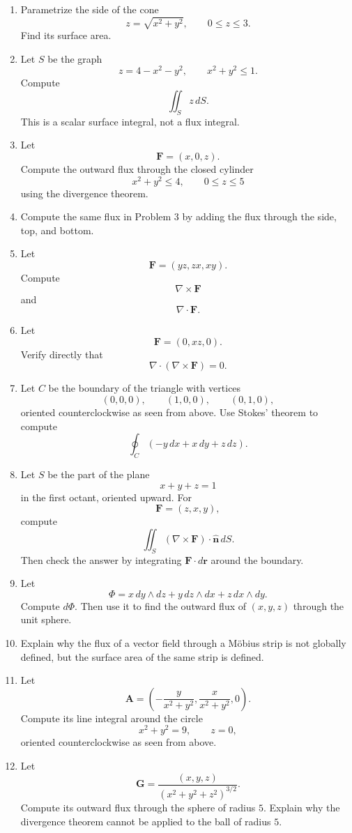 \begin{enumerate}
\item Parametrize the side of the cone
\[
    z=\sqrt{x^2+y^2},
    \qquad
    0\le z\le3.
\]
Find its surface area.

\item Let \(S\) be the graph
\[
    z=4-x^2-y^2,
    \qquad
    x^2+y^2\le1.
\]
Compute
\[
    \iint_S z\,dS.
\]
This is a scalar surface integral, not a flux integral.

\item Let
\[
    \mathbf F=(x,0,z).
\]
Compute the outward flux through the closed cylinder
\[
    x^2+y^2\le4,
    \qquad
    0\le z\le5
\]
using the divergence theorem.

\item Compute the same flux in Problem 3 by adding the flux through the side, top, and
bottom.

\item Let
\[
    \mathbf F=(yz,zx,xy).
\]
Compute
\[
    \nabla\times\mathbf F
\]
and
\[
    \nabla\cdot\mathbf F.
\]

\item Let
\[
    \mathbf F=(0,xz,0).
\]
Verify directly that
\[
    \nabla\cdot(\nabla\times\mathbf F)=0.
\]

\item Let \(C\) be the boundary of the triangle with vertices
\[
    (0,0,0),\qquad (1,0,0),\qquad (0,1,0),
\]
oriented counterclockwise as seen from above.  Use Stokes' theorem to compute
\[
    \oint_C(-y\,dx+x\,dy+z\,dz).
\]

\item Let \(S\) be the part of the plane
\[
    x+y+z=1
\]
in the first octant, oriented upward.  For
\[
    \mathbf F=(z,x,y),
\]
compute
\[
    \iint_S(\nabla\times\mathbf F)\cdot\widehat{\mathbf n}\,dS.
\]
Then check the answer by integrating \(\mathbf F\cdot d\mathbf r\) around the boundary.

\item Let
\[
    \Phi=x\,dy\wedge dz+y\,dz\wedge dx+z\,dx\wedge dy.
\]
Compute \(d\Phi\).  Then use it to find the outward flux of \((x,y,z)\) through the
unit sphere.

\item Explain why the flux of a vector field through a M\"obius strip is not globally
defined, but the surface area of the same strip is defined.

\item Let
\[
    \mathbf A=
    \left(
    -\frac{y}{x^2+y^2},
    \frac{x}{x^2+y^2},
    0
    \right).
\]
Compute its line integral around the circle
\[
    x^2+y^2=9,
    \qquad
    z=0,
\]
oriented counterclockwise as seen from above.

\item Let
\[
    \mathbf G=\frac{(x,y,z)}{(x^2+y^2+z^2)^{3/2}}.
\]
Compute its outward flux through the sphere of radius \(5\).  Explain why the
divergence theorem cannot be applied to the ball of radius \(5\).
\end{enumerate}

